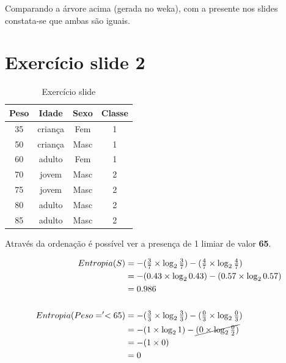\documentclass[
    article,            %
    11pt,               %
    oneside,            %
    a4paper,            %
    english,            %
    brazil,             %
    sumario=tradicional,
    ]{abntex2}
\begin{document}
Comparando a árvore acima (gerada no weka), com a presente nos slides constata-se que ambas são iguais.

\section*{\textbf{Exercício slide 2}}

\begin{table}[H]
\centering
\caption{Exercício slide}
\begin{tabular}{|c|c|c|c|}
\hline
\rowcolor[HTML]{C0C0C0} 
Peso & Idade & Sexo & Classe  \\ \hline
35 & criança & Fem & 1  \\ \hline
50 & criança & Masc & 1  \\ \hline
60 & adulto & Fem & 1  \\ \hline
70 & jovem & Masc & 2  \\ \hline
75 & jovem & Masc & 2  \\ \hline
80 & adulto & Masc & 2  \\ \hline
85 & adulto & Masc & 2  \\ \hline
\end{tabular}
\end{table}

Através da ordenação é possível ver a presença de 1 limiar de valor \textbf{65}.

\begin{align*}
Entropia(S) &= - (\tfrac{3}{7} \times \log_2 \tfrac{3}{7}) - (\tfrac{4}{7} \times \log_2 \tfrac{4}{7})   \\ 
            &= - (0.43 \times \log_2 0.43) - (0.57 \times \log_2 0.57)                                   \\
            &= 0.986                                                                                   \\\\
Entropia(Peso='<65) &= - (\tfrac{3}{3} \times \log_2 \tfrac{3}{3}) - (\tfrac{0}{3} \times \log_2 \tfrac{0}{3}) \\ 
              &= - (1 \times \log_2 1) - \cancel{(0 \times \log_2 \tfrac{0}{2})}                         \\
              &= - (1 \times 0)                                                                          \\
              &= 0                                                                                     \\\\      
\end{align*}
\end{document}

